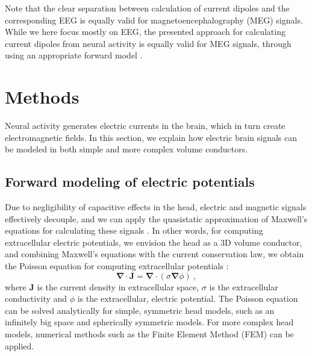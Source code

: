 \documentclass[preprint,10pt,authoryear]{elsarticle}
\newcommand{\hlp}[2][Purple]{ {\sethlcolor{#1} \hl{#2}} }
\newcommand{\sntxt}[1]{{\color{NavyBlue}#1}}
\newcommand{\tvntxt}[1]{{\color{Emerald}#1}}
\newcommand{\gen}[1]{\color{white}{\hlp{GTE: #1 }}\color{black}}
\begin{document}


\tvntxt{Note that the clear separation between calculation of current dipoles and the corresponding EEG is equally valid for magnetoencephalography (MEG) signals. While we here focus mostly on EEG, the presented approach for calculating current dipoles from neural activity is equally valid for MEG signals, through using an appropriate forward model \citep{Ilmoniemi2019}.}



\section{Methods}\label{sec:methods}
Neural activity generates electric currents in the brain, which in turn create electromagnetic fields. In this section, we explain how electric brain signals can be modeled in both simple and more complex volume conductors.

\subsection{Forward modeling of electric potentials}
Due to negligibility of capacitive effects in the head, electric and magnetic signals effectively decouple, and we can apply the quasistatic approximation of Maxwell's equations for calculating these signals \citep{HAMALAINEN1993,NUNEZ2006}. In other words, for computing extracellular electric potentials, we envision the head as a 3D volume conductor, and combining Maxwell's equations with the current conservation law, we obtain the Poisson equation for computing extracellular potentials \cite{GRIFFITHS1999}:
\begin{equation} \label{eq:poisson}
\mathbf{\nabla} \cdot \mathbf{J} = \mathbf{\nabla}  \cdot (\sigma \mathbf{\nabla} \phi)~,
\end{equation}
where $\mathbf{J}$ is the current density in extracellular space, $\sigma$ is the extracellular conductivity and $\phi$ is the extracellular, electric potential.
The Poisson equation can be solved analytically for simple, symmetric head models, such as an infinitely big space and spherically symmetric models. For more complex head models, numerical methods such as the Finite Element Method (FEM) can be applied.
\end{document}
